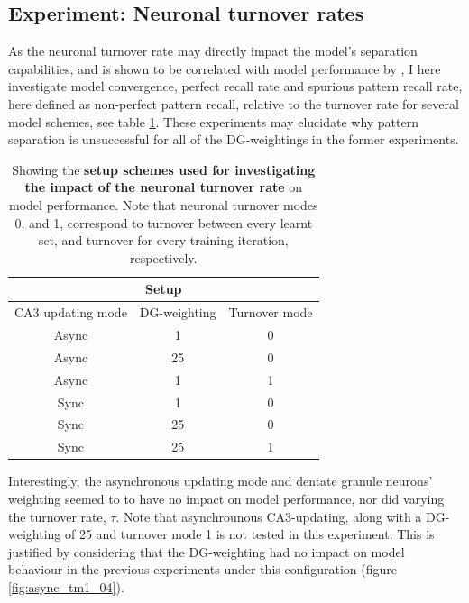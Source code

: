 \subsection{Experiment: Neuronal turnover rates}

As the neuronal turnover rate may directly impact the model's separation capabilities, and is shown to be correlated with model performance by \citep{Hattori2014}, I here investigate model convergence, perfect recall rate and spurious pattern recall rate, here defined as non-perfect pattern recall, relative to the turnover rate for several model schemes, see table \ref{table:turnover_schemes}. These experiments may elucidate why pattern separation is unsuccessful for all of the DG-weightings in the former experiments.

\begin{table}[]
\centering
\caption{Showing the \textbf{setup schemes used for investigating the impact of the neuronal turnover rate} on model performance. Note that neuronal turnover modes 0, and 1, correspond to turnover between every learnt set, and turnover for every training iteration, respectively.}
\label{table:turnover_schemes}
\begin{tabular}{|c|c|c|}
\hline
\multicolumn{3}{|c|}{Setup}                               \\ \hline
CA3 updating mode & DG-weighting & Turnover mode        \\ \hline
Async             & 1            & 0                      \\ \hline
Async             & 25           & 0                      \\ \hline
Async             & 1            & 1                      \\ \hline
Sync              & 1            & 0                      \\ \hline
Sync              & 25           & 0                      \\ \hline
Sync              & 25           & 1                      \\ \hline
\end{tabular}
\end{table}

Interestingly, the asynchronous updating mode and dentate granule neurons' weighting seemed to to have no impact on model performance, nor did varying the turnover rate, $\tau$. Note that asynchrounous CA3-updating, along with a DG-weighting of 25 and turnover mode 1 is not tested in this experiment. This is justified by considering that the DG-weighting had no impact on model behaviour in the previous experiments under this configuration (figure \ref{fig:async_tm1_04}).

